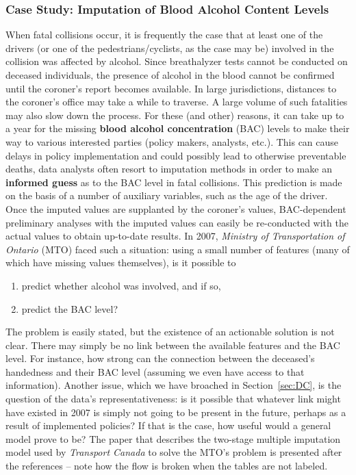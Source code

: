 \subsubsection{Case Study: Imputation of Blood Alcohol Content Levels}
When fatal collisions occur, it is frequently the case that at least one of the drivers (or one of the pedestrians/cyclists, as the case may be) involved in the collision was affected by alcohol. Since breathalyzer tests cannot be conducted on deceased individuals, the presence of alcohol in the blood cannot be confirmed until the coroner's report becomes available. 
\newl In large jurisdictions, distances to the coroner's office may take a while to traverse. A large volume of such fatalities may also slow down the process. For these (and other) reasons, it can take up to a year for the missing \textbf{blood alcohol concentration} (BAC) levels to make their way to various interested parties (policy makers, analysts, etc.). This can cause delays in policy implementation and could possibly lead to otherwise preventable deaths, data analysts often resort to imputation methods in order to make an \textbf{informed guess} as to the BAC level in fatal collisions. This prediction is made on the basis of a number of auxiliary variables, such as the age of the driver. Once the imputed values are supplanted by the coroner's values, BAC-dependent preliminary analyses with the imputed values can easily be re-conducted with the actual values to obtain up-to-date results.
\newl In 2007, \textit{Ministry of Transportation of Ontario} (MTO) faced such a situation: using a small number of features (many of which have missing values themselves), is it possible to 
\begin{enumerate}[noitemsep]
    \item predict whether alcohol was involved, and if so, 
    \item predict the BAC level?
\end{enumerate}
The problem is easily stated, but the existence of an actionable solution is not clear. There may simply be no link between the available features and the BAC level. For instance, how strong can the connection between the deceased's handedness and their BAC level (assuming we even have access to that information). \newl Another issue, which we have broached in Section~\ref{sec:DC}, is the question of the data's representativeness: is it possible that whatever link might have existed in 2007 is simply not going to be present in the future, perhaps as a result of implemented policies? If that is the case, how useful would a general model prove to be? 
\newl The paper that describes the two-stage multiple imputation model used by \textit{Transport Canada} to solve the MTO's problem is presented after the references -- note how the flow is broken when the tables are not labeled. 


